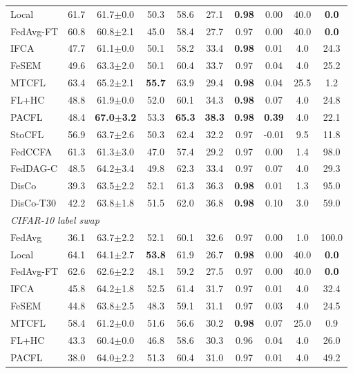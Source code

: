 {\begin{tabular}{lccccccccc}
Local & 61.7 & 61.7$\pm$0.0 & 50.3 & 58.6 & 27.1 & \textbf{0.98} & 0.00 & 40.0 & \textbf{0.0} \\
FedAvg-FT & 60.8 & 60.8$\pm$2.1 & 45.0 & 58.4 & 27.7 & 0.97 & 0.00 & 40.0 & \textbf{0.0} \\
IFCA & 47.7 & 61.1$\pm$0.0 & 50.1 & 58.2 & 33.4 & \textbf{0.98} & 0.01 & 4.0 & 24.3 \\
FeSEM & 49.6 & 63.3$\pm$2.0 & 50.1 & 60.4 & 33.7 & 0.97 & 0.04 & 4.0 & 25.2 \\
MTCFL & 63.4 & 65.2$\pm$2.1 & \textbf{55.7} & 63.9 & 29.4 & \textbf{0.98} & 0.04 & 25.5 & 1.2 \\
FL+HC & 48.8 & 61.9$\pm$0.0 & 52.0 & 60.1 & 34.3 & \textbf{0.98} & 0.07 & 4.0 & 24.8 \\
PACFL & 48.4 & \textbf{67.0$\pm$3.2} & 53.3 & \textbf{65.3} & \textbf{38.3} & \textbf{0.98} & \textbf{0.39} & 4.0 & 22.1 \\
StoCFL & 56.9 & 63.7$\pm$2.6 & 50.3 & 62.4 & 32.2 & 0.97 & -0.01 & 9.5 & 11.8 \\
FedCCFA & 61.3 & 61.3$\pm$3.0 & 47.0 & 57.4 & 29.2 & 0.97 & 0.00 & 1.4 & 98.0 \\
FedDAG-C & 48.5 & 64.2$\pm$3.4 & 49.8 & 62.3 & 33.4 & 0.97 & 0.07 & 4.0 & 29.3 \\
DisCo & 39.3 & 63.5$\pm$2.2 & 52.1 & 61.3 & 36.3 & \textbf{0.98} & 0.01 & 1.3 & 95.0 \\
DisCo-T30 & 42.2 & 63.8$\pm$1.8 & 51.5 & 62.0 & 36.8 & \textbf{0.98} & 0.10 & 3.0 & 59.0 \\
\midrule
\multicolumn{10}{l}{\textit{CIFAR-10 label swap}}\\
FedAvg & 36.1 & 63.7$\pm$2.2 & 52.1 & 60.1 & 32.6 & 0.97 & 0.00 & 1.0 & 100.0 \\
Local & 64.1 & 64.1$\pm$2.7 & \textbf{53.8} & 61.9 & 26.7 & \textbf{0.98} & 0.00 & 40.0 & \textbf{0.0} \\
FedAvg-FT & 62.6 & 62.6$\pm$2.2 & 48.1 & 59.2 & 27.5 & 0.97 & 0.00 & 40.0 & \textbf{0.0} \\
IFCA & 45.8 & 64.2$\pm$1.8 & 52.5 & 61.4 & 31.7 & 0.97 & 0.01 & 4.0 & 32.4 \\
FeSEM & 44.8 & 63.8$\pm$2.5 & 48.3 & 59.1 & 31.1 & 0.97 & 0.03 & 4.0 & 24.5 \\
MTCFL & 58.4 & 61.2$\pm$0.0 & 51.6 & 56.6 & 30.2 & \textbf{0.98} & 0.07 & 25.0 & 0.9 \\
FL+HC & 43.3 & 60.4$\pm$0.0 & 46.8 & 58.6 & 30.3 & 0.96 & 0.04 & 4.0 & 26.0 \\
PACFL & 38.0 & 64.0$\pm$2.2 & 51.3 & 60.4 & 31.0 & 0.97 & 0.01 & 4.0 & 49.2 \\

\end{tabular}}
